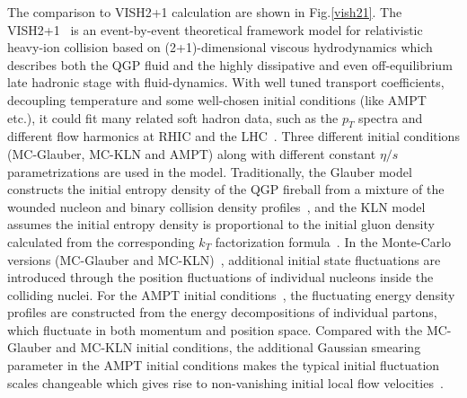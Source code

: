   The comparison to VISH2+1 calculation are shown in Fig.\ref{vish21}. The VISH2+1~\cite{Zhu:2016puf} is an event-by-event theoretical framework model for relativistic heavy-ion collision based on (2+1)-dimensional viscous hydrodynamics which describes both the QGP fluid and the highly dissipative and even off-equilibrium late hadronic stage with fluid-dynamics. With well tuned transport coefficients, decoupling temperature  and some well-chosen initial conditions (like {AMPT}~\cite{Xu:2016hmp,Bhalerao:2015iya,Pang:2012he} etc.), it could fit many related soft hadron data, such as the $p_T$ spectra and different flow harmonics at RHIC and the LHC~\cite{Qiu:2011hf, Shen:2010uy, Shen:2011eg, Bhalerao:2015iya}.
Three different initial conditions ({MC-Glauber}, {MC-KLN} and {AMPT}) along with different constant $\eta/s$ parametrizations are used in the model. 
Traditionally, the Glauber model constructs the initial entropy density of the QGP fireball from a mixture of the wounded nucleon and binary collision density profiles~\cite{Kolb:2000sd}, and the {KLN} model assumes the initial entropy density is proportional to the initial gluon density calculated from the corresponding $k_T$ factorization formula~\cite{Kharzeev:2000ph}. In the Monte-Carlo versions ({MC-Glauber} and {MC-KLN})~\cite{Miller:2007ri,Drescher:2006ca,Hirano:2009ah}, additional initial state fluctuations are introduced through the position fluctuations of individual nucleons inside the colliding nuclei. For the {AMPT} initial conditions~\cite{Bhalerao:2015iya,Pang:2012he,Xu:2016hmp}, the fluctuating energy density profiles are constructed from the energy decompositions of individual partons, which fluctuate in both momentum and position space. Compared with the {MC-Glauber} and {MC-KLN} initial conditions, the additional Gaussian smearing parameter in the {AMPT} initial conditions makes the typical initial fluctuation scales changeable which gives rise to non-vanishing initial local flow velocities~\cite{Pang:2012he}. 

